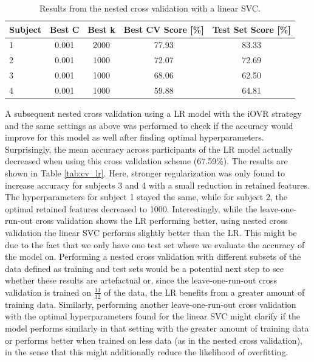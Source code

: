 \documentclass[11pt, a4paper]{article}
\begin{document}
\begin{table}[hbt!]
\centering
\caption{Results from the nested cross validation with a linear SVC.}
\begin{tabular}{||l||c|c|c|c||}
\hline
Subject & Best C & Best k & \multicolumn{1}{l|}{Best CV Score {[}\%{]}} & \multicolumn{1}{l||}{Test Set Score {[}\%{]}} \\ \hline \hline
1       & 0.001  & 2000   & 77.93                                       & 83.33                                        \\ \hline
2       & 0.001  & 1000   & 72.07                                       & 72.69                                        \\ \hline
3       & 0.001  & 1000   & 68.06                                       & 62.50                                        \\ \hline
4       & 0.001  & 1000   & 59.88                                       & 64.81                                        \\ \hline
\end{tabular}
\label{tab:ncv}
\end{table}
\break
A subsequent nested cross validation using a LR model with the iOVR strategy and the same settings as above was performed to check if the accuracy would improve for this model as well after finding optimal hyperparameters. Surprisingly, the mean accuracy across participants of the LR model actually decreased when using this cross validation scheme (67.59\%). The results are shown in Table \ref{tab:cv_lr}. Here, stronger regularization was only found to increase accuracy for subjects 3 and 4 with a small reduction in retained features. The hyperparameters for subject 1 stayed the same, while for subject 2, the optimal retained features decreased to 1000.
Interestingly, while the leave-one-run-out cross validation shows the LR performing better, using nested cross validation the linear SVC performs slightly better than the LR. This might be due to the fact that we only have one test set where we evaluate the accuracy of the model on. Performing a nested cross validation with different subsets of the data defined as training and test sets would be a potential next step to see whether these results are artefactual or, since the leave-one-run-out cross validation is trained on $\frac{11}{12}$ of the data, the LR benefits from a greater amount of training data. Similarly, performing another leave-one-run-out cross validation with the optimal hyperparameters found for the linear SVC might clarify if the model performs similarly in that setting with the greater amount of training data or performs better when trained on less data (as in the nested cross validation), in the sense that this might additionally reduce the likelihood of overfitting.
\end{document}
